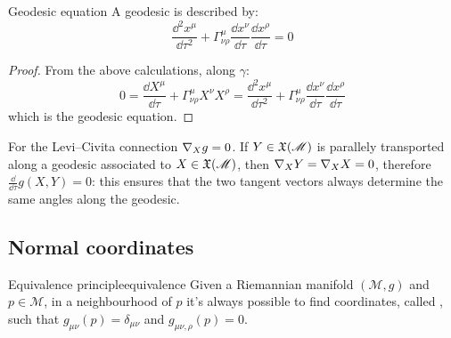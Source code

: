 \begin{proposition}{Geodesic equation}{}
  A geodesic is described by:
  \begin{equation}
    \frac{\dd^2 x^\mu}{\dd \tau^2} + \Gamma^\mu_{\nu \rho} \frac{\dd x^\nu}{\dd \tau} \frac{\dd x^\rho}{\dd \tau} = 0
    \label{eq:geodesic-equation}
  \end{equation}
\end{proposition}

\begin{proofbox}
  \begin{proof}
    From the above calculations, along $ \gamma $:
    \begin{equation*}
      0 = \frac{\dd X^\mu}{\dd \tau} + \Gamma^\mu_{\nu \rho} X^\nu X^\rho = \frac{\dd^2 x^\mu}{\dd \tau^2} + \Gamma^\mu_{\nu \rho} \frac{\dd x^\nu}{\dd \tau} \frac{\dd x^\rho}{\dd \tau}
    \end{equation*}
    which is the geodesic equation.
  \end{proof}
\end{proofbox}

For the Levi--Civita connection $ \nabla_X g = 0 $. If $ Y \in \mathfrak{X}(\mathscr{M}) $ is parallely transported along a geodesic associated to $ X \in \mathfrak{X}(\mathscr{M}) $, then $ \nabla_X Y = \nabla_X X = 0 $, therefore $ \frac{\dd}{\dd \tau} g(X,Y) = 0 $: this ensures that the two tangent vectors always determine the same angles along the geodesic.

\subsection{Normal coordinates}

\begin{theorem}{Equivalence principle}{equivalence}
  Given a Riemannian manifold $ (\mathcal{M},g) $ and $ p \in \mathcal{M} $, in a neighbourhood of $ p $ it's always possible to find coordinates, called , such that $ g_{\mu \nu}(p) = \delta_{\mu \nu} $ and $ g_{\mu \nu , \rho}(p) = 0 $.
\end{theorem}

